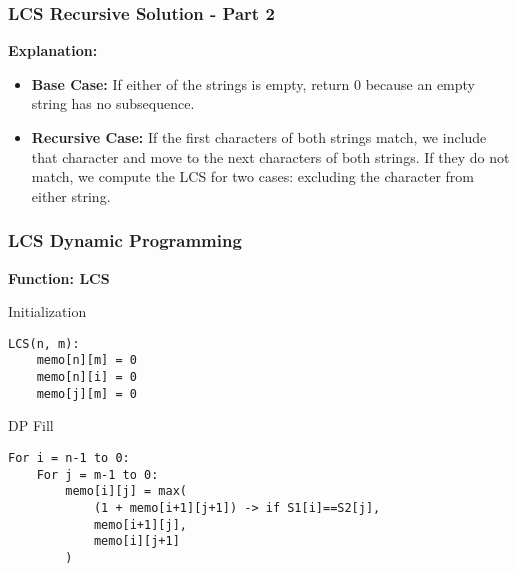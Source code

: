 \documentclass[10pt,aspectratio=43]{beamer}
\begin{document}
\begin{frame}
    \frametitle{LCS Recursive Solution - Part 2}

    \vspace{0.3cm}
    \textbf{Explanation:}
    \begin{itemize}
        \item \textbf{Base Case:} If either of the strings is empty, return 0 because an empty string has no subsequence.
        \item \textbf{Recursive Case:} If the first characters of both strings match, we include that character and move to the next characters of both strings. If they do not match, we compute the LCS for two cases: excluding the character from either string.
    \end{itemize}
\end{frame}




\begin{frame}[fragile]
    \frametitle{LCS Dynamic Programming}
    \textbf{Function: LCS}

    \begin{block}{Initialization}
    \begin{verbatim}
LCS(n, m):
    memo[n][m] = 0  
    memo[n][i] = 0  
    memo[j][m] = 0  
    \end{verbatim}
    \end{block}
    
    \begin{block}{DP Fill}
    \begin{verbatim}
For i = n-1 to 0:
    For j = m-1 to 0:
        memo[i][j] = max(
            (1 + memo[i+1][j+1]) -> if S1[i]==S2[j],
            memo[i+1][j],
            memo[i][j+1]
        )
    \end{verbatim}
    \end{block}
\end{frame}
\end{document}
